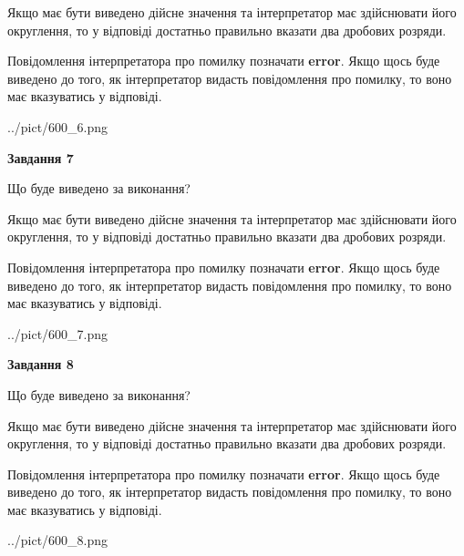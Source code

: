 \documentclass[12pt, ukrainian]{article}
\begin{document}
{\begin {Large}
Якщо має бути виведено дійсне значення та інтерпретатор має здійснювати його округлення, 
то у відповіді достатньо правильно вказати два дробових розряди.

Повідомлення інтерпретатора про помилку позначати \textbf{error}.
Якщо щось буде виведено до того, як інтерпретатор видасть повідомлення про помилку, 
то воно має вказуватись у відповіді. \par

\begin{center}
	{../pict/600_6.png}
\end{center}
\newpage

{\begin {center}\textbf{Завдання 7}\end {center}}\par
Що буде виведено за виконання? \par

Якщо має бути виведено дійсне значення та інтерпретатор має здійснювати його округлення, 
то у відповіді достатньо правильно вказати два дробових розряди.

Повідомлення інтерпретатора про помилку позначати \textbf{error}.
Якщо щось буде виведено до того, як інтерпретатор видасть повідомлення про помилку, 
то воно має вказуватись у відповіді. \par

\begin{center}
	{../pict/600_7.png}
\end{center}
\newpage

{\begin {center}\textbf{Завдання 8}\end {center}}\par
Що буде виведено за виконання? \par

Якщо має бути виведено дійсне значення та інтерпретатор має здійснювати його округлення, 
то у відповіді достатньо правильно вказати два дробових розряди.

Повідомлення інтерпретатора про помилку позначати \textbf{error}.
Якщо щось буде виведено до того, як інтерпретатор видасть повідомлення про помилку, 
то воно має вказуватись у відповіді. \par

\begin{center}
	{../pict/600_8.png}
\end{center}
\newpage


\end{Large}}
\end{document}
